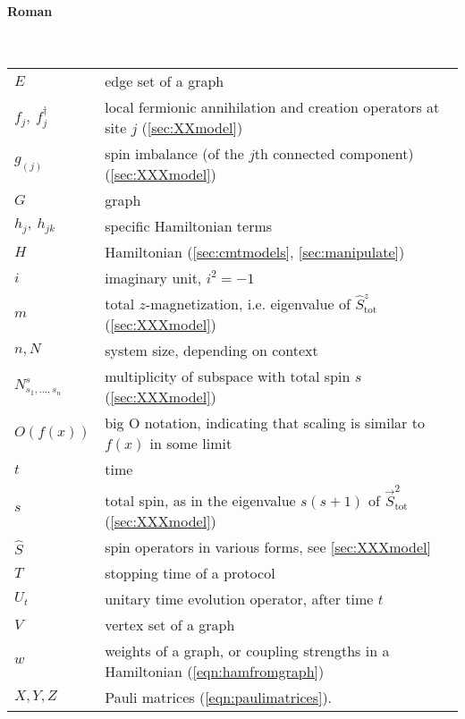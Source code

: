 {\paragraph{Roman} \mbox{} \\[5pt]
\begin{tabular}{ll}
$E$ 		& edge set of a graph \\
$f_j, \ f_j^\dagger$ 		& local fermionic annihilation and creation operators at site $j$  (\cref{sec:XXmodel}) \\
$g_{(j)}$ 	& spin imbalance (of the $j$th connected component) (\cref{sec:XXXmodel}) \\
$G$ 		& graph \\
$h_j,  ~ h_{jk} $ 		& specific Hamiltonian terms \\
$H$ 		& Hamiltonian (\cref{sec:cmtmodels}, \cref{sec:manipulate}) \\
$i$ 		& imaginary unit, $i^2 = -1$ \\
$m$ 		& total $z$-magnetization, i.e. eigenvalue of $\hat{S}_\text{tot}^z$ (\cref{sec:XXXmodel}) \\
$n, N$ 		& system size, depending on context \\
$N^{s}_{s_1, \ldots, s_n}$ & multiplicity of subspace with total spin $s$  (\cref{sec:XXXmodel}) \\
$O( f(x) )$ & big O notation, indicating that scaling is similar to $f(x)$ in some limit \\
$t$			& time \\
$s$			& total spin, as in the eigenvalue $s(s+1)$ of $\vec{S}^2_\text{tot}$ (\cref{sec:XXXmodel}) \\
$\hat{S}$	& spin operators in various forms, see \cref{sec:XXXmodel} \\
$T$			& stopping time of a protocol \\
$U_t$		& unitary time evolution operator, after time $t$ \\
$V$ 		& vertex set of a graph \\
$w$			& weights of a graph, or coupling strengths in a Hamiltonian (\cref{eqn:hamfromgraph}) \\
$X, Y, Z$ 	& Pauli matrices (\cref{eqn:paulimatrices}). 
\end{tabular}



}
